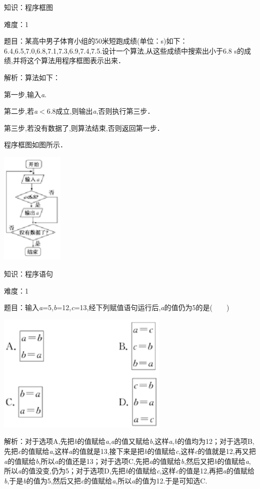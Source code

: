 \documentclass{article} %
\begin{document}
知识：程序框图

难度：1

题目：某高中男子体育小组的50米短跑成绩(单位：s)如下：6.4,6.5,7.0,6.8,7.1,7.3,6.9,7.4,7.5.设计一个算法,从这些成绩中搜索出小于6.8 s的成绩,并将这个算法用程序框图表示出来．

解析：算法如下：

第一步,输入\textit{a}.

第二步,若\textit{a}$\mathrm{<}$6.8成立,则输出\textit{a},否则执行第三步．

第三步,若没有数据了,则算法结束,否则返回第一步．

程序框图如图所示．

\includegraphics*[width=1.18in, height=2.14in, keepaspectratio=false]{image27}



知识：程序语句

难度：1

题目：输入\textit{a}=5,\textit{b}=12,\textit{c}=13,经下列赋值语句运行后,\textit{a}的值仍为5的是(　　)

\includegraphics*[width=3.23in, height=2.24in, keepaspectratio=false]{image28}

解析：对于选项A,先把\textit{b}的值赋给\textit{a},\textit{a}的值又赋给\textit{b},这样\textit{a},\textit{b}的值均为12；对于选项B,先把\textit{c}的值赋给\textit{a},这样\textit{a}的值就是13,接下来是把\textit{b}的值赋给\textit{c},这样\textit{c}的值就是12,再又把\textit{a}的值赋给\textit{b},所以\textit{a}的值还是13；对于选项C,先把\textit{a}的值赋给\textit{b},然后又把\textit{b}的值赋给\textit{a},所以\textit{a}的值没变,仍为5；对于选项D,先把\textit{b}的值赋给\textit{c},这样\textit{c}的值是12,再把\textit{a}的值赋给\textit{b},于是\textit{b}的值为5,然后又把\textit{c}的值赋给\textit{a},所以\textit{a}的值为12.于是可知选C.
\end{document}
